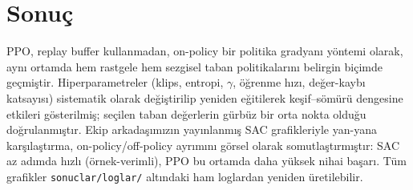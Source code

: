 \documentclass[11pt,a4paper]{article}
\newcommand{\reff}[1]{\texttt{#1}}
\begin{document}
\section{Sonuç}
PPO, replay buffer kullanmadan, on-policy bir politika gradyanı yöntemi olarak, aynı
ortamda hem rastgele hem sezgisel taban politikalarını belirgin biçimde geçmiştir.
Hiperparametreler (klips, entropi, $\gamma$, öğrenme hızı, değer-kaybı katsayısı)
sistematik olarak değiştirilip yeniden eğitilerek keşif--sömürü dengesine etkileri
gösterilmiş; seçilen taban değerlerin gürbüz bir orta nokta olduğu doğrulanmıştır.
Ekip arkadaşımızın yayınlanmış SAC grafikleriyle yan-yana karşılaştırma, on-policy/off-policy
ayrımını görsel olarak somutlaştırmıştır: SAC az adımda hızlı (örnek-verimli), PPO bu
ortamda daha yüksek nihai başarı.
Tüm grafikler \reff{sonuclar/loglar/} altındaki ham loglardan yeniden üretilebilir.
\end{document}
